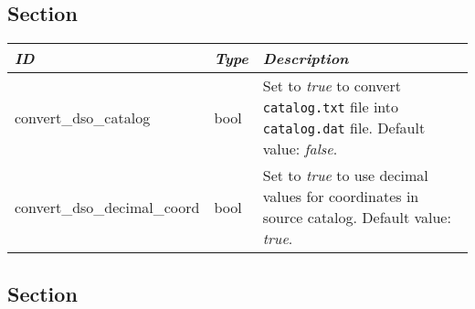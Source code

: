 \subsection{Section }\label{section-devel}

\begin{longtabu} to \textwidth {l|l|X}
\toprule
\emph{ID} & \emph{Type} & \emph{Description}\tabularnewline
\midrule
convert\_dso\_catalog & bool & Set to
\emph{true} to convert \texttt{catalog.txt} file into
\texttt{catalog.dat} file. Default value: \emph{false}.\tabularnewline
\midrule
convert\_dso\_decimal\_coord & bool & Set to
\emph{true} to use decimal values for coordinates in source
catalog. Default value: \emph{true}.\tabularnewline
\bottomrule
\end{longtabu}

\subsection{Section
}\label{section-dso-catalog-filters}

